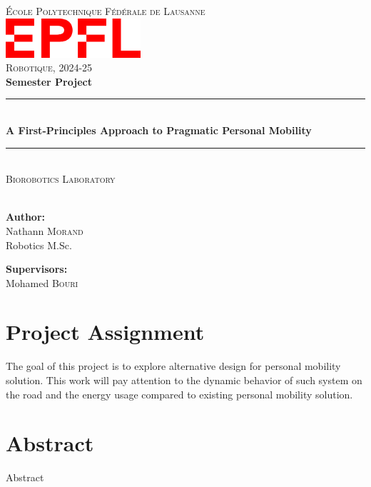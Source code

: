 \documentclass[a4paper, 11 pt]{article}
\begin{document}
\thispagestyle{empty}
\begin{center}
    \newcommand{\HRule}{\rule{\linewidth}{0.5mm}}
    
    \textsc{\LARGE École Polytechnique Fédérale de Lausanne}\\[0.5cm]
    \includegraphics[width=5cm]{Figures/epfl_red.png}\\[0.5cm]
    \LARGE{\textsc{Robotique, 2024-25}}\\[0.5cm]
    \huge{\textbf{Semester Project}}
    
    \HRule \\[0.4cm]
    {\huge \bfseries A First-Principles Approach to Pragmatic Personal Mobility}\\[0.1cm]
    \HRule \\[0.5cm]
    \LARGE{\textsc{Biorobotics Laboratory} \\
    }\\[0.5cm]
    
    \vspace{5mm}
    \vspace{15mm}
    
    \begin{minipage}{2in} \Large
    \textbf{Author:}\\
    Nathann \textsc{Morand}\\
    Robotics M.Sc.
    \end{minipage}
    \hfill
    \begin{minipage}{2.1in} \Large
    \textbf{Supervisors:}\\
    Mohamed \textsc{Bouri} \\
    \end{minipage}
\end{center}

\newpage
\renewcommand{\contentsname}{Table of Contents} 
{
  \hypersetup{linkcolor=black}
  \tableofcontents
}
\newpage

{ %

\section*{Project Assignment}
The goal of this project is to explore alternative design for personal mobility solution. This work will pay attention to the dynamic behavior of such system on the road and the energy usage compared to existing personal mobility solution.
\section*{Abstract}
Abstract
    
\newpage
}
\end{document}
